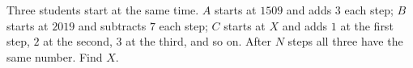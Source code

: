Three students start at the same time. $A$ starts at $1509$ and adds $3$ each step; $B$ starts at $2019$ and subtracts $7$ each step; $C$ starts at $X$ and adds $1$ at the first step, $2$ at the second, $3$ at the third, and so on. After $N$ steps all three have the same number. Find $X$.

